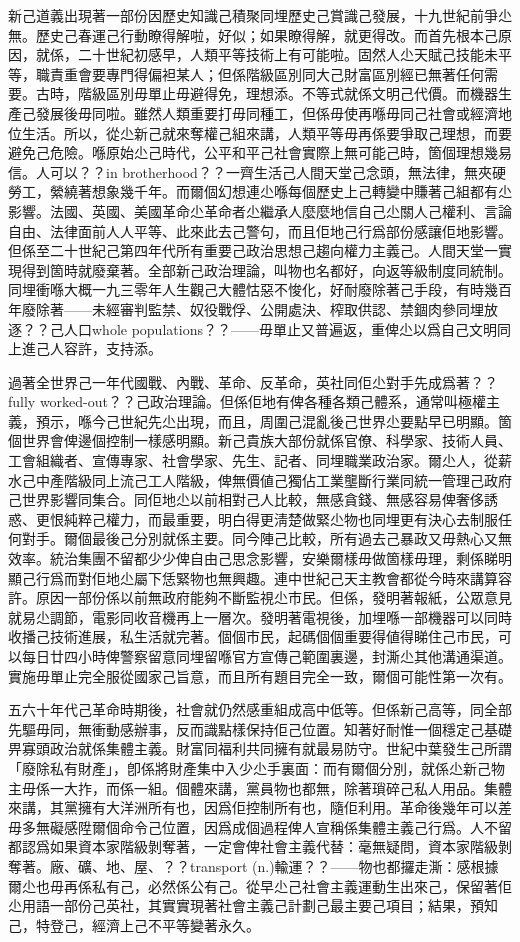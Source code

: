 新己道義出現著一部份因歷史知識己積聚同埋歷史己賞識己發展，十九世紀前爭尐無。歷史己春運己行動瞭得解啦，好似；如果瞭得解，就更得改。而首先根本己原因，就係，二十世紀初感早，人類平等技術上有可能啦。固然人尐天賦己技能未平等，職責重會要專門得偏袒某人；但係階級區別同大己財富區別經已無著任何需要。古時，階級區別毋單止毋避得免，理想添。不等式就係文明己代價。而機器生產己發展後毋同啦。雖然人類重要打毋同種工，但係毋使再喺毋同己社會或經濟地位生活。所以，從尐新己就來奪權己組來講，人類平等毋再係要爭取己理想，而要避免己危險。喺原始尐己時代，公平和平己社會實際上無可能己時，箇個理想幾易信。人可以？？in brotherhood？？一齊生活己人間天堂己念頭，無法律，無夾硬勞工，縈繞著想象幾千年。而爾個幻想連尐喺每個歷史上己轉變中賺著己組都有尐影響。法國、英國、美國革命尐革命者尐繼承人麼麼地信自己尐關人己權利、言論自由、法律面前人人平等、此來此去己警句，而且佢地己行爲部份感讓佢地影響。但係至二十世紀己第四年代所有重要己政治思想己趨向權力主義己。人間天堂一實現得到箇時就廢棄著。全部新己政治理論，叫物也名都好，向返等級制度同統制。同埋衝喺大概一九三零年人生觀己大體怙惡不悛化，好耐廢除著己手段，有時幾百年廢除著——未經審判監禁、奴役戰俘、公開處決、榨取供認、禁錮肉參同埋放逐？？己人口whole populations？？——毋單止又普遍返，重俾尐以爲自己文明同上進己人容許，支持添。

過著全世界己一年代國戰、內戰、革命、反革命，英社同佢尐對手先成爲著？？fully worked-out？？己政治理論。但係佢地有俾各種各類己體系，通常叫極權主義，預示，喺今己世紀先尐出現，而且，周圍己混亂後己世界尐要點早已明顯。箇個世界會俾邊個控制一樣感明顯。新己貴族大部份就係官僚、科學家、技術人員、工會組織者、宣傳專家、社會學家、先生、記者、同埋職業政治家。爾尐人，從薪水己中產階級同上流己工人階級，俾無價値己獨佔工業壟斷行業同統一管理己政府己世界影響同集合。同佢地尐以前相對己人比較，無感貪錢、無感容易俾奢侈誘惑、更恨純粹己權力，而最重要，明白得更淸楚做緊尐物也同埋更有決心去制服任何對手。爾個最後己分別就係主要。同今陣己比較，所有過去己暴政又毋熱心又無效率。統治集團不留都少少俾自由己思念影響，安樂爾樣毋做箇樣毋理，剩係睇明顯己行爲而對佢地尐屬下恁緊物也無興趣。連中世紀己天主教會都從今時來講算容許。原因一部份係以前無政府能夠不斷監視尐市民。但係，發明著報紙，公眾意見就易尐調節，電影同收音機再上一層次。發明著電視後，加埋喺一部機器可以同時收播己技術進展，私生活就完著。個個市民，起碼個個重要得値得睇住己市民，可以每日廿四小時俾警察留意同埋留喺官方宣傳己範圍裏邊，封澌尐其他溝通渠道。實施毋單止完全服從國家己旨意，而且所有題目完全一致，爾個可能性第一次有。

五六十年代己革命時期後，社會就仍然感重組成高中低等。但係新己高等，同全部先驅毋同，無衝動感辦事，反而識點樣保持佢己位置。知著好耐惟一個穩定己基礎畀寡頭政治就係集體主義。財富同福利共同擁有就最易防守。世紀中葉發生己所謂「廢除私有財產」，卽係將財產集中入少尐手裏面：而有爾個分別，就係尐新己物主毋係一大拃，而係一組。個體來講，黨員物也都無，除著瑣碎己私人用品。集體來講，其黨擁有大洋洲所有也，因爲佢控制所有也，隨佢利用。革命後幾年可以差毋多無礙感陞爾個命令己位置，因爲成個過程俾人宣稱係集體主義己行爲。人不留都認爲如果資本家階級剝奪著，一定會俾社會主義代替：毫無疑問，資本家階級剝奪著。廠、礦、地、屋、？？transport (n.)輸運？？——物也都攞走澌：感根據爾尐也毋再係私有己，必然係公有己。從早尐己社會主義運動生出來己，保留著佢尐用語一部份己英社，其實實現著社會主義己計劃己最主要己項目；結果，預知己，特登己，經濟上己不平等變著永久。

